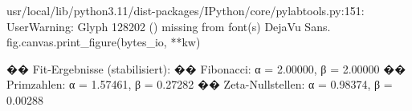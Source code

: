 usr/local/lib/python3.11/dist-packages/IPython/core/pylabtools.py:151: UserWarning: Glyph 128202 () missing from font(s) DejaVu Sans.
  fig.canvas.print_figure(bytes_io, **kw)


�� Fit-Ergebnisse (stabilisiert):
�� Fibonacci: α = 2.00000, β = 2.00000
�� Primzahlen: α = 1.57461, β = 0.27282
�� Zeta-Nullstellen: α = 0.98374, β = 0.00288